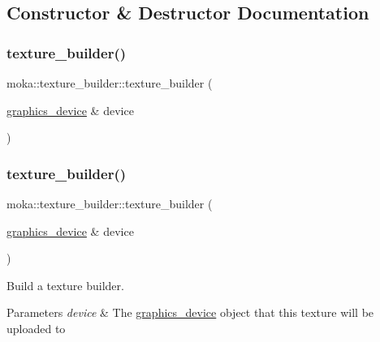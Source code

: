 \subsection{Constructor \& Destructor Documentation}
\mbox{\label{classmoka_1_1texture__builder_a37e13acb817ac3f5f5003278ae13bea0}} 
\subsubsection{\texorpdfstring{texture\_builder()}{texture\_builder()}\hspace{0.1cm}{\footnotesize\ttfamily [1/2]}}
{\footnotesize\ttfamily moka\+::texture\+\_\+builder\+::texture\+\_\+builder (\begin{DoxyParamCaption}\item[{\mbox{\hyperlink{classmoka_1_1graphics__device}{graphics\+\_\+device}} \&}]{device }\end{DoxyParamCaption})\hspace{0.3cm}{\ttfamily [explicit]}}

\mbox{\label{classmoka_1_1texture__builder_a37e13acb817ac3f5f5003278ae13bea0}} 
\subsubsection{\texorpdfstring{texture\_builder()}{texture\_builder()}\hspace{0.1cm}{\footnotesize\ttfamily [2/2]}}
{\footnotesize\ttfamily moka\+::texture\+\_\+builder\+::texture\+\_\+builder (\begin{DoxyParamCaption}\item[{\mbox{\hyperlink{classmoka_1_1graphics__device}{graphics\+\_\+device}} \&}]{device }\end{DoxyParamCaption})\hspace{0.3cm}{\ttfamily [explicit]}}



Build a texture builder. 


\begin{DoxyParams}{Parameters}
{\em device} & The \mbox{\hyperlink{classmoka_1_1graphics__device}{graphics\+\_\+device}} object that this texture will be uploaded to \\
\hline
\end{DoxyParams}


